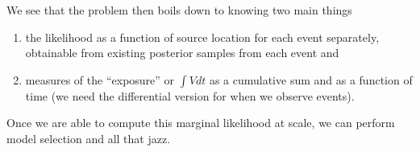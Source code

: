 \documentclass{article}
\begin{document}
We see that the problem then boils down to knowing two main things
\begin{enumerate}
    \item{the likelihood as a function of source location for each event separately, obtainable from existing posterior samples from each event and}
    \item{measures of the ``exposure'' or $\int Vdt$ as a cumulative sum and as a function of time (we need the differential version for when we observe events).}
\end{enumerate}
Once we are able to compute this marginal likelihood at scale, we can perform model selection and all that jazz.

\end{document}
